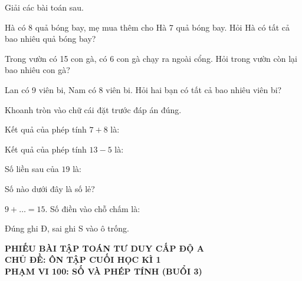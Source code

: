 \documentclass[../main.tex]{subfiles}
\begin{document}
\begin{bt}
    Giải các bài toán sau.
    \begin{listEX}
        \item Hà có 8 quả bóng bay, mẹ mua thêm cho Hà 7 quả bóng bay. Hỏi Hà có tất cả bao nhiêu quả bóng bay?
        \OTkhungpt
        \item Trong vườn có 15 con gà, có 6 con gà chạy ra ngoài cổng. Hỏi trong vườn còn lại bao nhiêu con gà?
        \OTkhungpt
        \item Lan có 9 viên bi, Nam có 8 viên bi. Hỏi hai bạn có tất cả bao nhiêu viên bi?
        \OTkhungpt
    \end{listEX}
\end{bt}
\begin{bt}
    Khoanh tròn vào chữ cái đặt trước đáp án đúng.
    \par\nopagebreak
    \begin{listEX}
        \item Kết quả của phép tính $7+8$ là:
        \item Kết quả của phép tính $13-5$ là:
        \item Số liền sau của $19$ là:
        \item Số nào dưới đây là số lẻ?
        \item $9+\ldots=15$. Số điền vào chỗ chấm là:
    \end{listEX}
\end{bt}
\begin{bt}
    Đúng ghi Đ, sai ghi S vào ô trống.
    \par\nopagebreak\vspace{4pt}
\end{bt}
\newpage
\TTdatlaibai
{\centering
        {\color{mauchinh!120}\bfseries\Large PHIẾU BÀI TẬP TOÁN TƯ DUY CẤP ĐỘ A}\\[3pt]
        {\color{mauchinh!120}\bfseries\Large CHỦ ĐỀ: ÔN TẬP CUỐI HỌC KÌ 1\\[2pt] PHẠM VI 100: SỐ VÀ PHÉP TÍNH (BUỔI 3)}\par}
\vspace{6pt}
\TTthongtin
\end{document}
